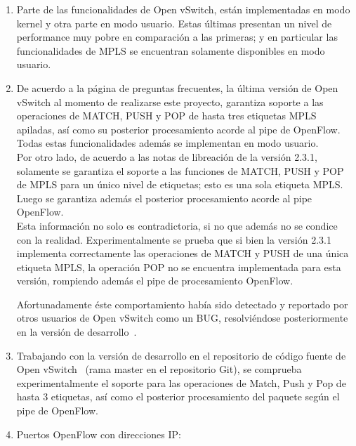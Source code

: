 \begin{enumerate}
\item Parte de las funcionalidades de Open vSwitch, est\'an implementadas en modo kernel y otra parte en modo usuario. Estas \'ultimas presentan un nivel de performance muy pobre en comparaci\'on a las primeras; y en particular las funcionalidades de MPLS se encuentran solamente disponibles en modo usuario.

\item De acuerdo a la p\'agina de preguntas frecuentes, la \'ultima versi\'on de Open vSwitch al momento de realizarse este proyecto, garantiza soporte a las operaciones de MATCH, PUSH y POP de hasta tres etiquetas MPLS apiladas, as\'i como su posterior procesamiento acorde al pipe de OpenFlow. Todas estas funcionalidades adem\'as se implementan en modo usuario.\\

Por otro lado, de acuerdo  a las notas de libreaci\'on de la versi\'on 2.3.1, solamente se garantiza el soporte a las funciones de MATCH, PUSH y POP de MPLS para un \'unico nivel de etiquetas; esto es una sola etiqueta MPLS. Luego se garantiza adem\'as el posterior procesamiento acorde al pipe OpenFlow.\\

Esta informaci\'on no solo es contradictoria, si no que adem\'as no se condice con la realidad. Experimentalmente se prueba que si bien la versi\'on 2.3.1 implementa correctamente las operaciones de MATCH y PUSH de una \'unica etiqueta MPLS, la operaci\'on POP no se encuentra implementada para esta versi\'on, rompiendo adem\'as el pipe de procesamiento OpenFlow. 

Afortunadamente \'este comportamiento hab\'ia sido detectado y reportado por otros usuarios de Open vSwitch como un BUG, resolviéndose posteriormente en la versi\'on de desarrollo~\citep{OVSSourceCode}.

\item Trabajando con la versi\'on de desarrollo en el repositorio de c\'odigo fuente de Open vSwitch~\citep{OVSSourceCode} (rama master en el repositorio Git), se comprueba experimentalmente el soporte para las operaciones de Match, Push y Pop de hasta 3 etiquetas, as\'i como el posterior procesamiento del paquete seg\'un el pipe de  OpenFlow.

\item Puertos OpenFlow con direcciones IP:
 

\end{enumerate}
